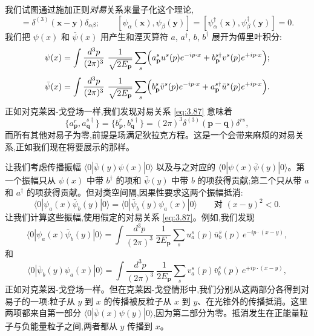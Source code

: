 我们试图通过施加正则\emph{对易}关系来量子化这个理论,
\begin{equation}
  [\psi_\alpha(\mathbf{x}), \psi_\beta^\dagger(\mathbf{y})]
    = \delta^{(3)}(\mathbf{x}-\mathbf{y})\delta_{\alpha\beta};
  \qquad
  [\psi_\alpha(\mathbf{x}), \psi_\beta(\mathbf{y})]
  = [\psi_\alpha^\dagger(\mathbf{x}), \psi_\beta^\dagger(\mathbf{y})] = 0 .
  \label{eq:3.87}
\end{equation}
我们把 $\psi(x)$ 和 $\bar{\psi}(x)$ 用产生和湮灭算符 $a$, $a^\dagger$, $b$, $b^\dagger$ 展开为傅里叶积分:
\begin{equation}
  \psi(x) = \int \frac{d^3p}{(2\pi)^3}\ \frac{1}{\sqrt{2E_{\mathbf{p}}}}
    \sum_s \Bigl( a_{\mathbf{p}}^s u^s(p)e^{-ip\cdot x}
      + b_{\mathbf{p}}^{s\dagger} v^s(p)e^{+ip\cdot x} \Bigr);
  \label{eq:3.88}
\end{equation}
\begin{equation}
  \bar{\psi}(x) = \int \frac{d^3p}{(2\pi)^3}\ \frac{1}{\sqrt{2E_{\mathbf{p}}}}
    \sum_s \Bigl( b_{\mathbf{p}}^s \bar{v}^s(p)e^{-ip\cdot x}
      + a_{\mathbf{p}}^{s\dagger} \bar{u}^s(p)e^{+ip\cdot x} \Bigr).
  \label{eq:3.89}
\end{equation}
正如对克莱因-戈登场一样,我们发现对易关系 \eqref{eq:3.87} 意味着
\begin{equation}
  \{a_{\mathbf{p}}^r, a_{\mathbf{q}}^{s\dagger}\}
  = \{b_{\mathbf{p}}^r, b_{\mathbf{q}}^{s\dagger}\}
    = (2\pi)^3\delta^{(3)}(\mathbf{p}-\mathbf{q})\delta^{rs},
  \label{eq:3.90}
\end{equation}
而所有其他对易子为零,前提是场满足狄拉克方程。这是一个会带来麻烦的对易关系,正如我们现在将要展示的那样。

让我们考虑传播振幅 $\langle 0|\bar{\psi}(y)\psi(x)|0\rangle$ 以及与之对应的 $\langle 0|\psi(x)\bar{\psi}(y)|0\rangle$。第一个振幅只从 $\psi(x)$ 中带 $b^\dagger$ 的项和 $\bar{\psi}(y)$ 中带 $b$ 的项获得贡献;第二个只从带 $a$ 和 $a^\dagger$ 的项获得贡献。但对类空间隔,因果性要求这两个振幅抵消:
\begin{equation}
  \langle 0|\psi_a(x)\bar{\psi}_b(y)|0\rangle
  = \langle 0|\bar{\psi}_b(y)\psi_a(x)|0\rangle
  \qquad\text{对 } (x-y)^2<0 .
  \label{eq:3.91}
\end{equation}
让我们计算这些振幅,使用假定的对易关系 \eqref{eq:3.87}。例如,我们发现
\begin{equation}
  \langle 0|\psi_a(x)\bar{\psi}_b(y)|0\rangle =
    \int \frac{d^3p}{(2\pi)^3}\ \frac{1}{2E_{\mathbf{p}}}
    \sum_s u_a^s(p)\bar{u}_b^s(p)\, e^{-ip\cdot(x-y)},
  \label{eq:3.92}
\end{equation}
和
\begin{equation}
  \langle 0|\bar{\psi}_b(y)\psi_a(x)|0\rangle =
    \int \frac{d^3p}{(2\pi)^3}\ \frac{1}{2E_{\mathbf{p}}}
    \sum_s v_a^s(p)\bar{v}_b^s(p)\, e^{+ip\cdot(x-y)},
  \label{eq:3.93}
\end{equation}
正如对克莱因-戈登场一样。但在克莱因-戈登情形中,我们分别从这两部分各得到对易子的一项:粒子从 $y$ 到 $x$ 的传播被反粒子从 $x$ 到 $y$、在光锥外的传播抵消。这里两项都来自第一部分 $\langle 0|\bar{\psi}(x)\psi(y)|0\rangle$,因为第二部分为零。抵消发生在正能量粒子与负能量粒子之间,两者都从 $y$ 传播到 $x$。

